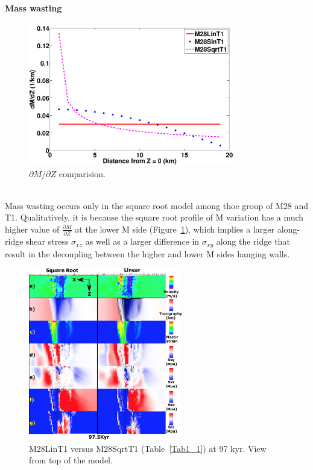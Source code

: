 \paragraph{Mass wasting}

\begin{figure}[h]
  \centering
    \includegraphics[width=0.8\textwidth]{./Figures/fig_Results_3_3_1_M_type_plot_dM_dZ.eps}
  \caption{$\partial M/ \partial Z$ comparision.}
 \label{fig_Results_3_3_1_M_type_plot_dM_dZ}
\end{figure}  

~\\
Mass wasting occurs only in the square root model among thoe group of M28 and T1. Qualitatively, it is because the square root profile of M variation has a much higher value of $\frac{\partial M}{\partial Z}$ at the lower M side (Figure~\hyperref[fig_Results_3_3_1_M_type_plot_dM_dZ]{\ref{fig_Results_3_3_1_M_type_plot_dM_dZ}}), which implies a larger along-ridge shear stress $\sigma_{xz}$ as well as a larger difference in $\sigma_{xy}$ along the ridge that result in the decoupling between the higher and lower M sides hanging walls.

\iffalse
\begin{figure}[h]
  \centering
    \includegraphics[width=0.6\textwidth]{./Figures/fig_Results4_3_sqrt_vs_lin_cut_back_97kyr.eps}
  \caption{M28LinT1 versus M28SqrtT1 (Table~\hyperref[Tab1_1]{\ref{Tab1_1}}) at 97 kyr. View from top of the model.}
 \label{fig_Results4_3_1}
\end{figure}  

